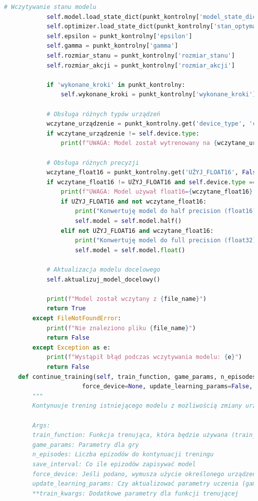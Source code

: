 \documentclass[a4paper,12pt]{article}
\begin{document}
\begin{lstlisting}[language=Python]
            # Wczytywanie stanu modelu
            self.model.load_state_dict(punkt_kontrolny['model_state_dict'])
            self.optimizer.load_state_dict(punkt_kontrolny['stan_optymalizatora'])
            self.epsilon = punkt_kontrolny['epsilon']
            self.gamma = punkt_kontrolny['gamma']
            self.rozmiar_stanu = punkt_kontrolny['rozmiar_stanu']
            self.rozmiar_akcji = punkt_kontrolny['rozmiar_akcji']
            
            if 'wykonane_kroki' in punkt_kontrolny:
                self.wykonane_kroki = punkt_kontrolny['wykonane_kroki']
            
            # Obsługa różnych typów urządzeń
            wczytane_urządzenie = punkt_kontrolny.get('device_type', 'cpu')
            if wczytane_urządzenie != self.device.type:
                print(f"UWAGA: Model został wytrenowany na {wczytane_urządzenie}, a obecnie używasz {self.device.type}.")
                
            # Obsługa różnych precyzji
            wczytane_float16 = punkt_kontrolny.get('UŻYJ_FLOAT16', False)
            if wczytane_float16 != UŻYJ_FLOAT16 and self.device.type == 'cuda':
                print(f"UWAGA: Model używał float16={wczytane_float16}, a obecnie float16={UŻYJ_FLOAT16}.")
                if UŻYJ_FLOAT16 and not wczytane_float16:
                    print("Konwertuję model do half precision (float16)...")
                    self.model = self.model.half()
                elif not UŻYJ_FLOAT16 and wczytane_float16:
                    print("Konwertuję model do full precision (float32)...")
                    self.model = self.model.float()
            
            # Aktualizacja modelu docelowego
            self.aktualizuj_model_docelowy()
            
            print(f"Model został wczytany z {file_name}")
            return True
        except FileNotFoundError:
            print(f"Nie znaleziono pliku {file_name}")
            return False
        except Exception as e:
            print(f"Wystąpił błąd podczas wczytywania modelu: {e}")
            return False
    def continue_training(self, train_function, game_params, n_episodes=100, save_interval=10, 
                      force_device=None, update_learning_params=False, **train_kwargs):
        """
        Kontynuuje trening istniejącego modelu z możliwością zmiany urządzenia obliczeniowego.
    
        Args:
        train_function: Funkcja trenująca, która będzie używana (train_hybrid lub train_cpu_only)
        game_params: Parametry dla gry
        n_episodes: Liczba epizodów do kontynuacji treningu
        save_interval: Co ile epizodów zapisywać model
        force_device: Jeśli podano, wymusza użycie określonego urządzenia ('cpu' lub 'cuda')
        update_learning_params: Czy aktualizować parametry uczenia (gamma, epsilon, itp.)
        **train_kwargs: Dodatkowe parametry dla funkcji trenującej
    

\end{lstlisting}
\end{document}
